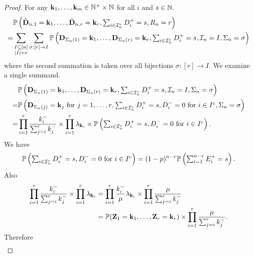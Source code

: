 \begin{proof}
    For any ${\mathbf k}_1, \ldots, {\mathbf k}_m \in {\mathbb N}^+ \times {\mathbb N}$ for all $i$ and $s \in {\mathbb N}$.
    \begin{align*}
        & {\mathbb P}\left(\hat{{\mathbf D}}_{n, 1} = {\mathbf k}_1, \ldots, \hat{{\mathbf D}}_{n, r} = {\mathbf k}_r, \textstyle \sum_{i \in {\mathcal I}_n^c} D_i^+ = s, R_n = r \right) \\
        =& \sum_{\substack{I \subseteq [n] \\ \lvert I\rvert = r}} \sum_{\sigma: [r] \to I}
        {\mathbb P}\left({\mathbf D}_{\Sigma_n(1)} = {\mathbf k}_1, \ldots, {\mathbf D}_{\Sigma_n(r)} = {\mathbf k}_r, \textstyle \sum_{i \in {\mathcal I}_n^c} D_i^+ = s, {\mathcal I}_n = I, \Sigma_n = \sigma \right)
    \end{align*}
    where the second summation is taken over all bijections $\sigma: [r] \to I$. We examine a single summand.
    \begin{align*}
        &{\mathbb P}\left({\mathbf D}_{\Sigma_n(1)} = {\mathbf k}_1, \ldots, {\mathbf D}_{\Sigma_n(r)} = {\mathbf k}_r, \textstyle \sum_{i \in {\mathcal I}_n^c} D_i^+ = s, {\mathcal I}_n = I, \Sigma_n = \sigma \right) \\
        =&{\mathbb P}\left(
            {\mathbf D}_{\Sigma_n(j)} = {\mathbf k}_j\ \text{for $j = 1, \ldots, r$},
            \textstyle \sum_{i \in {\mathcal I}_n^c} D_i^+ = s,
            D^-_i = 0\ \text{for $i \in I^c$},
            \Sigma_n = \sigma
            \right)  \\
        =& \prod_{i=1}^r \frac{k_i^-}{\sum_{j=i}^r k_j^-}
        \times \prod_{i=1}^r \lambda_{{\mathbf k}_i}
        \times {\mathbb P}\left( 
            \textstyle \sum_{i \in {\mathcal I}_n^c} D_i^+ = s,
            D^-_i = 0\ \text{for $i \in I^c$}
         \right).
    \end{align*}
    We have
    \begin{equation*}
        {\mathbb P}\left( 
            \textstyle \sum_{i \in {\mathcal I}_n^c} D_i^+ = s,
            D^-_i = 0\ \text{for $i \in I^c$}
         \right)
         = (1-p)^{n-r} {\mathbb P}\left( 
             \textstyle \sum_{i=1}^{n-r} E^+_i = s
          \right).
    \end{equation*}
    Also
    \begin{align*}
        \prod_{i=1}^r \frac{k_i^-}{\sum_{j=i}^r k_j^-} \times \prod_{i=1}^r \lambda_{{\mathbf k}_i}
        &= \prod_{i=1}^r \frac{k_i^-}{\mu} \lambda_{{\mathbf k}_i} \times \prod_{i=1}^r \frac{\mu}{\sum_{j=i}^r k_j^-} \\
        &= {\mathbb P}({\mathbf Z}_1 = {\mathbf k}_1, \ldots, {\mathbf Z}_r = {\mathbf k}_r)
        \times \prod_{i=1}^r \frac{\mu}{\sum_{j=i}^r k_j^-}.
    \end{align*}
    Therefore
    \begin{align*}

\end{align*}
\end{proof}
